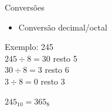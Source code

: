 

\begin{frame}{Conversões}
    \begin{itemize}
        \item Conversão decimal/octal
    \end{itemize}
    Exemplo: 245 \\[0.2cm]
    \centering
    $245 \div 8 = 30$ resto 5 \\[0.2cm]
    $30 \div 8 = 3$ resto 6 \\[0.2cm]
    $3 \div 8 = 0$ resto 3 \\[0.4cm]
    \vspace{0.2cm}

    $245_{10} = 365_{8}$
\end{frame}